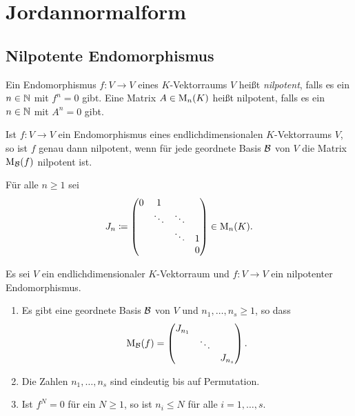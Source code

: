 \section{Jordannormalform}










\subsection{Nilpotente Endomorphismus}


\begin{definition}
  Ein Endomorphismus $f \colon V \to V$ eines $K$-Vektorraums $V$ heißt \emph{nilpotent}, falls es ein $n \in \mathbb{N}$ mit $f^n = 0$ gibt.
  Eine Matrix $A \in \mathrm{M}_n(K)$ heißt nilpotent, falls es ein $n \in \mathbb{N}$ mit $A^n = 0$ gibt.
\end{definition}


\begin{lemma}
  Ist $f \colon V \to V$ ein Endomorphismus eines endlichdimensionalen $K$-Vek\-tor\-raums $V$, so ist $f$ genau dann nilpotent, wenn für jede geordnete Basis $\mathcal{B}$ von $V$ die Matrix $\mathrm{M}_{\mathcal{B}}(f)$ nilpotent ist.
\end{lemma}


\begin{notation}
  Für alle $n \geq 1$ sei
  \[
    J_n
    \coloneqq
    \begin{pmatrix}
      0 & 1       &         &   \\
        & \ddots  & \ddots  &   \\
        &         & \ddots  & 1 \\
        &         &         & 0
    \end{pmatrix}
    \in \mathrm{M}_n(K).
  \]
\end{notation}


\begin{theorem}\label{thrm: Jordan normal form for nilpotent}
  Es sei $V$ ein endlichdimensionaler $K$-Vektorraum und $f \colon V \to V$ ein nilpotenter Endomorphismus.
  \begin{enumerate}[leftmargin=*, label=\roman*)]
    \item
      Es gibt eine geordnete Basis $\mathcal{B}$ von $V$ und $n_1, \dotsc, n_s \geq 1$, so dass
      \[
        \mathrm{M}_{\mathcal{B}}(f)
        =
        \begin{pmatrix}
          J_{n_1} &         &         \\
                  & \ddots  &         \\
                  &         & J_{n_s}
        \end{pmatrix}.
      \]
    \item
      Die Zahlen $n_1, \dotsc, n_s$ sind eindeutig bis auf Permutation.
    \item
      Ist $f^N = 0$ für ein $N \geq 1$, so ist $n_i \leq N$ für alle $i = 1, \dotsc, s$.
  \end{enumerate}
\end{theorem}


